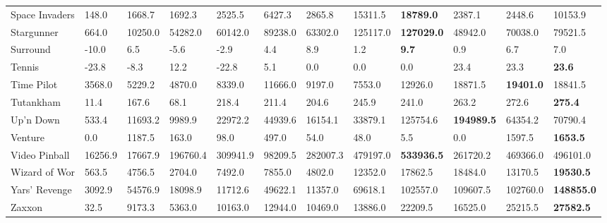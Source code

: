 \documentclass{article}
\begin{document}
\begin{table}[h]
\begin{scriptsize}
\begin{sc}
\begin{tabular}{| p{2.4cm} p{0.84cm} p{0.84cm} p{0.84cm} p{0.84cm} p{0.84cm} p{0.84cm} p{0.84cm} p{0.84cm} p{0.84cm} p{0.84cm} p{0.84cm} |}
Space Invaders & 148.0 & 1668.7 & 1692.3 & 2525.5 & 6427.3 & 2865.8 & 15311.5 & {\bf 18789.0} & 2387.1 & 2448.6 & 10153.9\\
Stargunner & 664.0 & 10250.0 & 54282.0 & 60142.0 & 89238.0 & 63302.0 & 125117.0 & {\bf 127029.0} & 48942.0 & 70038.0 & 79521.5\\
Surround & -10.0 & 6.5 & -5.6 & -2.9 & 4.4 & 8.9 & 1.2 & {\bf 9.7} & 0.9 & 6.7 & 7.0\\
Tennis & -23.8 & -8.3 & 12.2 & -22.8 & 5.1 & 0.0 & 0.0 & 0.0 & 23.4 & 23.3 & {\bf 23.6}\\
Time Pilot & 3568.0 & 5229.2 & 4870.0 & 8339.0 & 11666.0 & 9197.0 & 7553.0 & 12926.0 & 18871.5 & {\bf 19401.0} & 18841.5\\
Tutankham & 11.4 & 167.6 & 68.1 & 218.4 & 211.4 & 204.6 & 245.9 & 241.0 & 263.2 & 272.6 & {\bf 275.4}\\
Up'n Down & 533.4 & 11693.2 & 9989.9 & 22972.2 & 44939.6 & 16154.1 & 33879.1 & 125754.6 & {\bf 194989.5} & 64354.2 & 70790.4\\
Venture & 0.0 & 1187.5 & 163.0 & 98.0 & 497.0 & 54.0 & 48.0 & 5.5 & 0.0 & 1597.5 & {\bf 1653.5}\\
Video Pinball & 16256.9 & 17667.9 & 196760.4 & 309941.9 & 98209.5 & 282007.3 & 479197.0 & {\bf 533936.5} & 261720.2 & 469366.0 & 496101.0\\
Wizard of Wor & 563.5 & 4756.5 & 2704.0 & 7492.0 & 7855.0 & 4802.0 & 12352.0 & 17862.5 & 18484.0 & 13170.5 & {\bf 19530.5}\\
Yars' Revenge & 3092.9 & 54576.9 & 18098.9 & 11712.6 & 49622.1 & 11357.0 & 69618.1 & 102557.0 & 109607.5 & 102760.0 & {\bf 148855.0}\\
Zaxxon & 32.5 & 9173.3 & 5363.0 & 10163.0 & 12944.0 & 10469.0 & 13886.0 & 22209.5 & 16525.0 & 25215.5 & {\bf 27582.5}\\
\hline
\end{tabular}
\clearpage{}
\end{sc}
\end{scriptsize}
\end{table}
\end{document}
